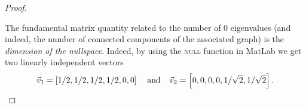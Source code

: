 \documentclass{tutorial}
\begin{document}
\begin{proof}
\begin{center}
 \end{center}
The fundamental matrix quantity related to the number of $0$ eigenvalues (and indeed, the number of connected components of the associated graph) is the \emph{dimension of the nullspace}. Indeed, by using the \textsc{null} function in MatLab we get two linearly independent vectors
\[
  \vec{v}_1 = \left[ 1/2, 1/2, 1/2, 1/2, 0, 0 \right]
  \hspace{0.15in} \text{and} \hspace{0.15in}
  \vec{v}_2 = \left[ 0, 0, 0, 0, 1/\sqrt{2}, 1/\sqrt{2} \right] .
\]
\end{proof}\else \newpage \fi
\end{document}
